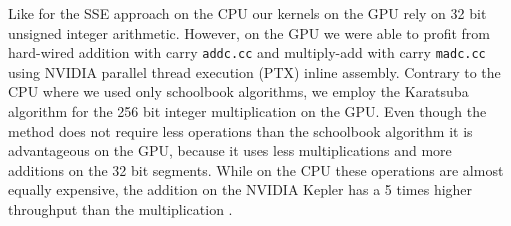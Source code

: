 \documentclass[oribibl,a4paper]{llncs2e/llncs}
\begin{document}
Like for the SSE approach on the CPU our kernels on the GPU rely on 32 bit unsigned integer arithmetic.
However, on the GPU we were able to profit from hard-wired addition with carry \verb|addc.cc| and multiply-add with carry \verb|madc.cc| using NVIDIA parallel thread execution (PTX) inline assembly.
Contrary to the CPU where we used only schoolbook algorithms, we employ the Karatsuba algorithm \cite{Karatsuba1963} for the 256 bit integer multiplication on the GPU.
Even though the method does not require less operations than the schoolbook algorithm it is advantageous on the GPU, because it uses less multiplications and more additions on the 32 bit segments.
While on the CPU these operations are almost equally expensive, the addition on the NVIDIA Kepler has a 5 times higher throughput than the multiplication \cite{CUDAProgramming}.

\end{document}
